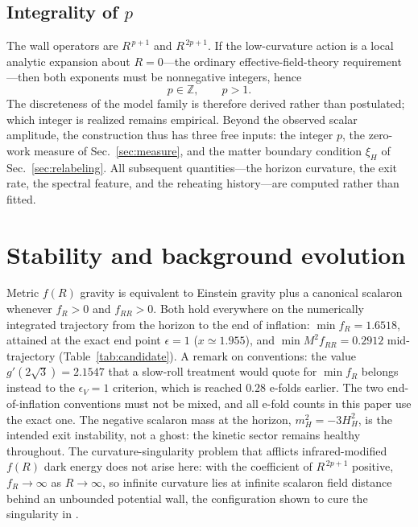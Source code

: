 \documentclass[aps,prd,twocolumn,superscriptaddress,nofootinbib,longbibliography]{revtex4-2}
\begin{document}
\subsection{Integrality of $p$}
The wall operators are $R^{\,p+1}$ and $R^{\,2p+1}$. If the low-curvature
action is a local analytic expansion about $R=0$---the ordinary
effective-field-theory requirement---then both exponents must be nonnegative
integers, hence
\begin{equation}
p\in\mathbb{Z},\qquad p>1 .
\end{equation}
The discreteness of the model family is therefore derived rather than
postulated; which integer is realized remains empirical. Beyond the observed
scalar amplitude, the construction thus has three free inputs: the integer
$p$, the zero-work measure of Sec.~\ref{sec:measure}, and the matter
boundary condition $\xi_H$ of Sec.~\ref{sec:relabeling}. All
subsequent quantities---the horizon curvature, the exit rate, the spectral
feature, and the reheating history---are computed rather than fitted.

\section{Stability and background evolution}
\label{sec:stability}
Metric $f(R)$ gravity is equivalent to Einstein gravity plus a canonical
scalaron whenever $f_R>0$ and $f_{RR}>0$. Both hold everywhere on the
numerically integrated trajectory from the horizon to the end of inflation:
$\min f_R=1.6518$, attained at the exact end point $\epsilon=1$
($x\simeq1.955$), and $\min M^2f_{RR}=0.2912$ mid-trajectory
(Table~\ref{tab:candidate}). A remark on conventions: the value
$g'(2\sqrt3)=2.1547$ that a slow-roll treatment would quote for $\min f_R$
belongs instead to the $\epsilon_V=1$ criterion, which is reached $0.28$
e-folds earlier. The two end-of-inflation conventions must not be mixed, and
all e-fold counts in this paper use the exact one. The negative scalaron
mass at the horizon, $m_H^2=-3H_H^2$, is
the intended exit instability, not a ghost: the kinetic sector remains
healthy throughout. The curvature-singularity problem that afflicts
infrared-modified $f(R)$ dark energy \cite{Frolov2008} does not arise here:
with the coefficient of $R^{\,2p+1}$ positive, $f_R\to\infty$ as
$R\to\infty$, so infinite curvature lies at infinite scalaron field distance
behind an unbounded potential wall, the configuration shown to cure the
singularity in \cite{Appleby2010}.
\end{document}
